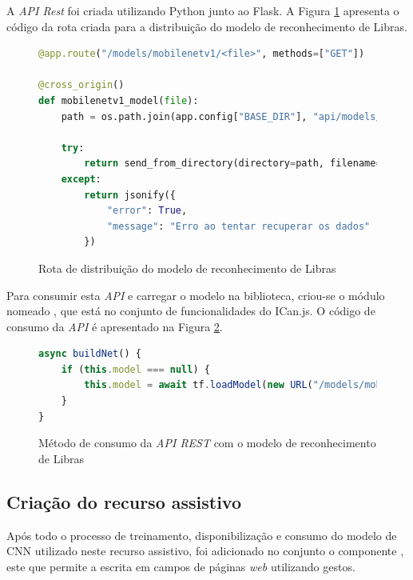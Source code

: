 \par A \textit{API Rest} foi criada utilizando Python junto ao Flask. A Figura \ref{figure:exemplo_rota_flask} apresenta o código da rota criada para a distribuição do modelo de reconhecimento de Libras.

\begin{figure}[H]
    \centering
    \begin{lstlisting}[language=Python]
@app.route("/models/mobilenetv1/<file>", methods=["GET"])

@cross_origin()
def mobilenetv1_model(file):
    path = os.path.join(app.config["BASE_DIR"], "api/models/mobilenetv1")

    try:
        return send_from_directory(directory=path, filename=file)
    except:
        return jsonify({
            "error": True,
            "message": "Erro ao tentar recuperar os dados"
        })
    \end{lstlisting}
    \caption{Rota de distribuição do modelo de reconhecimento de Libras}
    \label{figure:exemplo_rota_flask}
\end{figure}

\par Para consumir esta \textit{API} e carregar o modelo na biblioteca, criou-se o módulo nomeado , que está no conjunto  de funcionalidades do ICan.js. O código de consumo da \textit{API} é apresentado na Figura \ref{figure:exemplo_consome_api}.

\begin{figure}[H]
    \centering
    \begin{lstlisting}[language=Javascript]
async buildNet() {
    if (this.model === null) {
        this.model = await tf.loadModel(new URL("/models/mobilenetv1/model.json", MODEL_URL).href);
    }
}
    \end{lstlisting}
    \caption{Método de consumo da \textit{API REST} com o modelo de reconhecimento de Libras}
    \label{figure:exemplo_consome_api}
\end{figure}

\subsection{Criação do recurso assistivo}

\par Após todo o processo de treinamento, disponibilização e consumo do modelo de CNN utilizado neste recurso assistivo, foi adicionado no conjunto  o componente , este que permite a escrita em campos de páginas \textit{web} utilizando gestos.

